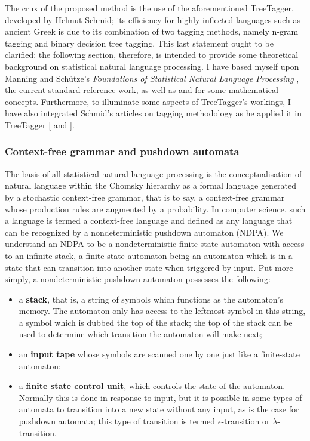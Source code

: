 The crux of the proposed method is the use of the aforementioned TreeTagger,
developed by Helmut Schmid; its efficiency for highly inflected languages such
as ancient Greek is due to its combination of two tagging methods, namely
n-gram tagging and binary decision tree tagging. This last statement ought to
be clarified: the following section, therefore, is intended to provide some
theoretical background on statistical natural language processing. I have based
myself upon Manning and Schütze's \textit{Foundations of Statistical Natural
Language Processing} \citep{manning1999}, the current standard reference work,
as well as \citet{koshy2004} and \citet{hopcroft2001} for some mathematical concepts.  Furthermore, to
illuminate some aspects of TreeTagger's workings, I have also integrated
Schmid's articles on tagging methodology as he applied it in TreeTagger
[\citeyear{schmid1994} and \citeyear{schmid1995}]. 


\subsubsection{Context-free grammar and pushdown automata} %
\label{sub:formallang}

The basis of all statistical natural language processing is the
conceptualisation of natural language within the Chomsky hierarchy as a formal
language generated by a stochastic context-free grammar, that is to say, a
context-free grammar whose production rules are augmented by a probability. In
computer science, such a language is termed a context-free language and defined
as any language that can be recognized by a nondeterministic pushdown
automaton (NDPA). We understand an NDPA to be a nondeterministic finite state
automaton with access to an infinite stack, a finite state automaton being an
automaton which is in a state that can transition into another state when
triggered by input. Put more simply, a nondeterministic pushdown automaton
possesses the following:

\begin{itemize} 
  
  \item a \textbf{stack}, that is, a string of symbols which functions as the
    automaton's memory. The automaton only has access to the leftmost symbol in
    this string, a symbol which is dubbed the top of the stack; the top of the
    stack can be used to determine which transition the automaton will make
    next;
    
  \item an \textbf{input tape} whose symbols are scanned one by one just like a
    finite-state automaton; 
    
    \item a \textbf{finite state control unit}, which controls the state of the
      automaton. Normally this is done in response to input, but it is possible
      in some types of automata to transition into a new state without any
      input, as is the case for pushdown automata; this type of transition is
      termed $\epsilon$-transition or $\lambda$-transition.
    
\end{itemize}

